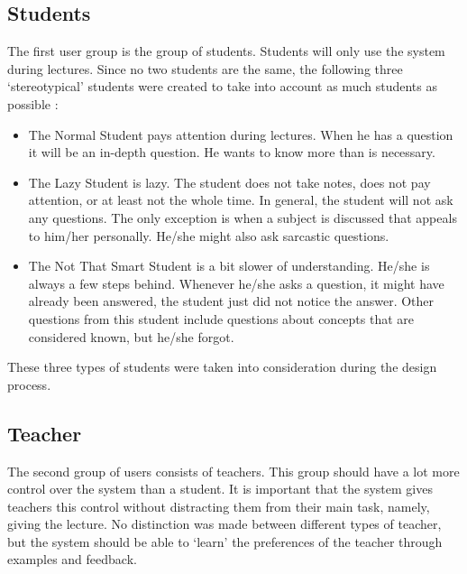 \documentclass[11pt]{article}
\begin{document}
\subsection{Students}
The first user group is the group of students. Students will only use the system during lectures. 
Since no two students are the same, the following three `stereotypical' students were created to take into account as much students as possible :
\begin{itemize}
\item The Normal Student pays attention during lectures. When he has a question it will be an in-depth question. He wants to know more than is necessary.
\item The Lazy Student is lazy. The student does not take notes, does not pay attention, or at least not the whole time. In general, the student will not ask any questions. The only exception is when a subject is discussed that appeals to him/her personally. He/she might also ask sarcastic questions.
\item The Not That Smart Student is a bit slower of understanding. He/she is always a few steps behind. Whenever he/she asks a question, it might have already been answered, the student just did not notice the answer. Other questions from this student include questions about concepts that are considered known, but he/she forgot.
\end{itemize}
These three types of students were taken into consideration during the design process.

\subsection{Teacher}
The second group of users consists of teachers. This group should have a lot more control over the system than a student. It is important that the system gives teachers this control without distracting them from their main task, namely, giving the lecture. No distinction was made between different types of teacher, but the system should be able to `learn' the preferences of the teacher through examples and feedback. 
\end{document}
